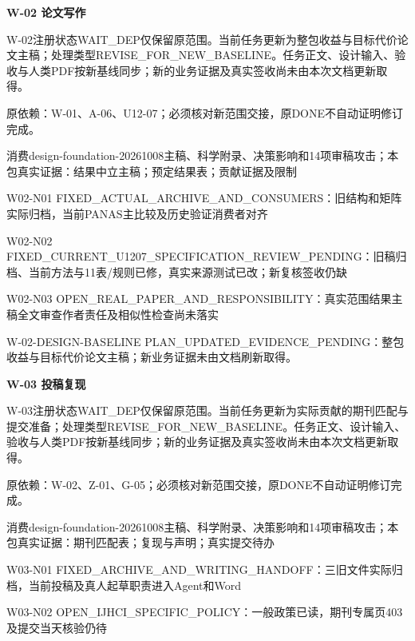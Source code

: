 \documentclass[11pt,a4paper]{article}
\newcommand{\reviewsection}[1]{\par\Needspace{5\baselineskip}\vspace{10pt}\begin{center}{\titlelatin\titlecjk\bfseries\fontsize{14}{20}\selectfont #1}\end{center}}
\begin{document}
\reviewsection{W-\allowbreak{}02 论文写作}
W-\allowbreak{}02注册状态WAIT\_\allowbreak{}DEP仅保留原范围。当前任务更新为整包收益与目标代价论文主稿；处理类型REVISE\_\allowbreak{}FOR\_\allowbreak{}NEW\_\allowbreak{}BASELINE。任务正文、设计输入、验收与人类PDF按新基线同步；新的业务证据及真实签收尚未由本次文档更新取得。


原依赖：W-\allowbreak{}01、A-\allowbreak{}06、U12-\allowbreak{}07；必须核对新范围交接，原DONE不自动证明修订完成。


消费design-\allowbreak{}foundation-\allowbreak{}20261008主稿、科学附录、决策影响和14项审稿攻击；本包真实证据：结果中立主稿；预定结果表；贡献证据及限制


W02-\allowbreak{}N01 FIXED\_\allowbreak{}ACTUAL\_\allowbreak{}ARCHIVE\_\allowbreak{}AND\_\allowbreak{}CONSUMERS：旧结构和矩阵实际归档，当前PANAS主比较及历史验证消费者对齐


W02-\allowbreak{}N02 FIXED\_\allowbreak{}CURRENT\_\allowbreak{}U1207\_\allowbreak{}SPECIFICATION\_\allowbreak{}REVIEW\_\allowbreak{}PENDING：旧稿归档、当前方法与11表/\allowbreak{}规则已修，真实来源测试已改；新复核签收仍缺


W02-\allowbreak{}N03 OPEN\_\allowbreak{}REAL\_\allowbreak{}PAPER\_\allowbreak{}AND\_\allowbreak{}RESPONSIBILITY：真实范围结果主稿全文审查作者责任及相似性检查尚未落实


W-\allowbreak{}02-\allowbreak{}DESIGN-\allowbreak{}BASELINE PLAN\_\allowbreak{}UPDATED\_\allowbreak{}EVIDENCE\_\allowbreak{}PENDING：整包收益与目标代价论文主稿；新业务证据未由文档刷新取得。


\reviewsection{W-\allowbreak{}03 投稿复现}
W-\allowbreak{}03注册状态WAIT\_\allowbreak{}DEP仅保留原范围。当前任务更新为实际贡献的期刊匹配与提交准备；处理类型REVISE\_\allowbreak{}FOR\_\allowbreak{}NEW\_\allowbreak{}BASELINE。任务正文、设计输入、验收与人类PDF按新基线同步；新的业务证据及真实签收尚未由本次文档更新取得。


原依赖：W-\allowbreak{}02、Z-\allowbreak{}01、G-\allowbreak{}05；必须核对新范围交接，原DONE不自动证明修订完成。


消费design-\allowbreak{}foundation-\allowbreak{}20261008主稿、科学附录、决策影响和14项审稿攻击；本包真实证据：期刊匹配表；复现与声明；真实提交待办


W03-\allowbreak{}N01 FIXED\_\allowbreak{}ARCHIVE\_\allowbreak{}AND\_\allowbreak{}WRITING\_\allowbreak{}HANDOFF：三旧文件实际归档，当前投稿及真人起草职责进入Agent和Word


W03-\allowbreak{}N02 OPEN\_\allowbreak{}IJHCI\_\allowbreak{}SPECIFIC\_\allowbreak{}POLICY：一般政策已读，期刊专属页403及提交当天核验仍待
\end{document}
